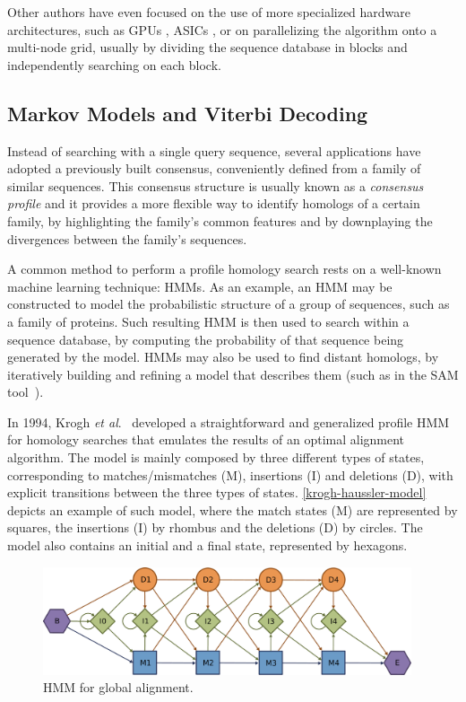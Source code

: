 \documentclass{bmcart}
\begin{document}
Other authors have even focused on the use of more specialized hardware architectures, such as GPUs \cite{gpus}, ASICs \cite{fpgas}, or on parallelizing the algorithm onto a multi-node grid, usually by dividing the sequence database in blocks and independently searching on each block.

\subsection*{Markov Models and Viterbi Decoding}

Instead of searching with a single query sequence, several applications have adopted a previously built consensus, conveniently defined from a family of similar sequences. This consensus structure is usually known as a \textit{consensus profile} and it provides a more flexible way to identify homologs of a certain family, by highlighting the family's common features and by downplaying the divergences between the family's sequences.

A common method to perform a profile homology search rests on a well-known machine learning technique: \acp{HMM}. As an example, an \ac{HMM} may be constructed to model the probabilistic structure of a group of sequences, such as a family of proteins. Such resulting \ac{HMM} is then used to search within a sequence database, by computing the probability of that sequence being generated by the model.
\acp{HMM} may also be used to find distant homologs, by iteratively building and refining a model that describes them (such as in the SAM tool~\cite{sam}).

In 1994, Krogh \emph{et al}.~\cite{krogh1994} developed a
straightforward and generalized profile \ac{HMM}  for homology searches that emulates the results of an optimal alignment algorithm. The model is mainly composed by three different types of states, corresponding to matches/mismatches (M), insertions (I) and deletions (D), with explicit transitions between the three types of states. \autoref{krogh-haussler-model} depicts an example of such model, where the match states (M) are represented by squares, the insertions (I) by rhombus and the deletions (D) by circles. The model also contains an initial and a final state, represented by hexagons.

\begin{figure}[h!]
  \centering
  \includegraphics[width=0.97\textwidth]{img/krogh-haussler-model.eps} 
  \caption{HMM for global alignment.}
  \label{krogh-haussler-model}
\end{figure}
\end{document}
